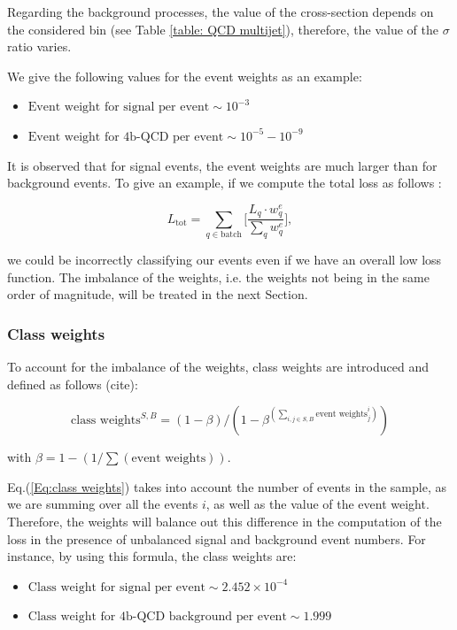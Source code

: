 Regarding the background processes, the value of the cross-section depends on the considered \Ht bin (see Table \ref{table: QCD  multijet}), therefore, the value of the $\sigma$ ratio varies.

\vspace{0.1 cm}

\noindent We give the following values for the event weights as an example:

\begin{itemize}
    \item $\text{Event weight for signal per event} \sim 10^{-3}$
    \item $\text{Event weight for 4b-QCD per event} \sim 10^{-5}-10^{-9}$
\end{itemize}

It is observed that for signal events, the event weights are much larger than for background events. To give an example, if we compute the total loss as follows :

\begin{equation}
    L_{\text{tot}}= \sum_{q \in \text{batch}} \bigg[\frac{L_q \cdot w^e_q}{\sum_q w^e_q} \bigg] ,
\label{Eq: loss event weights}
\end{equation}

\noindent we could be incorrectly classifying our events even if we have an overall low loss function. The imbalance of the weights, i.e. the weights not being in the same order of magnitude, will be treated in the next Section.


\subsubsection{Class weights}

To account for the imbalance of the weights, class weights are introduced and defined as follows (cite):

\begin{equation}
    \text{class weights}^{S,B} = (1- \beta)/ (1- \beta^{(\sum_{i,j\in S,B}\text{event weights}^i_j)})
    \label{Eq:class weights}
\end{equation}

\noindent with $\beta= 1 - (1/\sum (\text{event weights}))$.

\vspace{0.1cm}

Eq.(\ref{Eq:class weights}) takes into account the number of events in the sample, as we are summing over all the events $i$, as well as the value of the event weight. Therefore, the weights will balance out this difference in the computation of the loss in the presence of unbalanced signal and background event numbers. For instance, by using this formula, the class weights are:
\begin{itemize}
    \item $\text{Class weight for signal per event} \sim 2.452 \times 10^{-4}$
    \item $\text{Class weight for 4b-QCD background per event} \sim 1.999$
\end{itemize}


